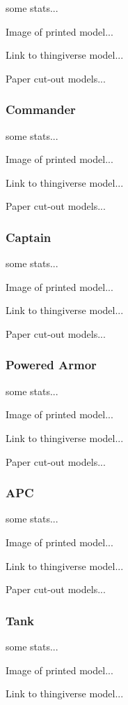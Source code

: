 \documentclass{article}
\begin{document}
some stats...

Image of printed model...

Link to thingiverse model...

Paper cut-out models...

\subsubsection{Commander}

some stats...

Image of printed model...

Link to thingiverse model...

Paper cut-out models...

\subsubsection{Captain}

some stats...

Image of printed model...

Link to thingiverse model...

Paper cut-out models...

\subsubsection{Powered Armor}

some stats...

Image of printed model...

Link to thingiverse model...

Paper cut-out models...

\subsubsection{APC}

some stats...

Image of printed model...

Link to thingiverse model...

Paper cut-out models...

\subsubsection{Tank}

some stats...

Image of printed model...

Link to thingiverse model...
\end{document}
